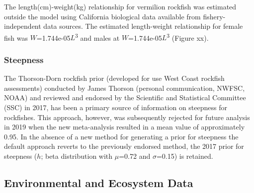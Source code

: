 \documentclass[11pt,
  english,
  a4paper,
]{article}
\begin{document}
\leavevmode\tagmcend\tagstructend

The length(cm)-weight(kg) relationship for vermilion rockfish was estimated outside the model using California biological data available from fishery-independent data sources. The estimated length-weight relationship for female fish was {\(W\)\leavevmode\tagmcend\tagstructend}=1.744e-05{\(L\)\leavevmode\tagmcend\tagstructend}\textsuperscript{3} and males at {\(W\)\leavevmode\tagmcend\tagstructend}=1.744e-05{\(L\)\leavevmode\tagmcend\tagstructend}\textsuperscript{3} (Figure xx).


\hypertarget{steepness}{%
\subsubsection{Steepness}\label{steepness}}

\leavevmode\tagmcend\tagstructend

The Thorson-Dorn rockfish prior (developed for use West Coast rockfish assessments) conducted by James Thorson (personal communication, NWFSC, NOAA) and reviewed and endorsed by the Scientific and Statistical Committee (SSC) in 2017, has been a primary source of information on steepness for rockfishes. This approach, however, was subsequently rejected for future analysis in 2019 when the new meta-analysis resulted in a mean value of approximately 0.95. In the absence of a new method for generating a prior for steepness the default approach reverts to the previously endorsed method, the 2017 prior for steepness ({\(h\)\leavevmode\tagmcend\tagstructend}; beta distribution with {\(\mu\)\leavevmode\tagmcend\tagstructend}=0.72 and {\(\sigma\)\leavevmode\tagmcend\tagstructend}=0.15) is retained.


\hypertarget{environmental-and-ecosystem-data}{%
\subsection{Environmental and Ecosystem Data}\label{environmental-and-ecosystem-data}}
\end{document}
